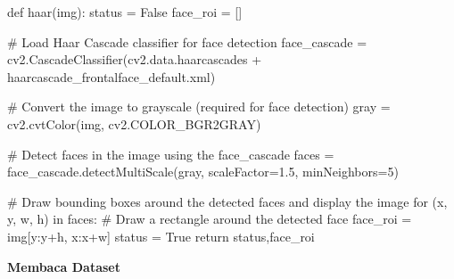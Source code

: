 \documentclass[
  letterpaper,
  DIV=11,
  numbers=noendperiod]{scrreprt}
\newenvironment{Shaded}{\begin{snugshade}}{\end{snugshade}}
\newcommand{\CommentTok}[1]{\textcolor[rgb]{0.37,0.37,0.37}{#1}}
\newcommand{\ControlFlowTok}[1]{\textcolor[rgb]{0.00,0.23,0.31}{#1}}
\newcommand{\DecValTok}[1]{\textcolor[rgb]{0.68,0.00,0.00}{#1}}
\newcommand{\FloatTok}[1]{\textcolor[rgb]{0.68,0.00,0.00}{#1}}
\newcommand{\KeywordTok}[1]{\textcolor[rgb]{0.00,0.23,0.31}{#1}}
\newcommand{\NormalTok}[1]{\textcolor[rgb]{0.00,0.23,0.31}{#1}}
\newcommand{\OperatorTok}[1]{\textcolor[rgb]{0.37,0.37,0.37}{#1}}
\newcommand{\StringTok}[1]{\textcolor[rgb]{0.13,0.47,0.30}{#1}}
\newcommand{\VariableTok}[1]{\textcolor[rgb]{0.07,0.07,0.07}{#1}}
\begin{document}
\begin{Shaded}
\begin{Highlighting}[]
\KeywordTok{def}\NormalTok{ haar(img):}
\NormalTok{    status }\OperatorTok{=} \VariableTok{False}
\NormalTok{    face\_roi }\OperatorTok{=}\NormalTok{ [] }

    \CommentTok{\# Load Haar Cascade classifier for face detection}
\NormalTok{    face\_cascade }\OperatorTok{=}\NormalTok{ cv2.CascadeClassifier(cv2.data.haarcascades }\OperatorTok{+} \StringTok{\textquotesingle{}haarcascade\_frontalface\_default.xml\textquotesingle{}}\NormalTok{) }

    \CommentTok{\# Convert the image to grayscale (required for face detection)}
\NormalTok{    gray }\OperatorTok{=}\NormalTok{ cv2.cvtColor(img, cv2.COLOR\_BGR2GRAY)}

    \CommentTok{\# Detect faces in the image using the face\_cascade}
\NormalTok{    faces }\OperatorTok{=}\NormalTok{ face\_cascade.detectMultiScale(gray, scaleFactor}\OperatorTok{=}\FloatTok{1.5}\NormalTok{, minNeighbors}\OperatorTok{=}\DecValTok{5}\NormalTok{) }

    \CommentTok{\# Draw bounding boxes around the detected faces and display the image}
    \ControlFlowTok{for}\NormalTok{ (x, y, w, h) }\KeywordTok{in}\NormalTok{ faces:}
        \CommentTok{\# Draw a rectangle around the detected face}
\NormalTok{        face\_roi }\OperatorTok{=}\NormalTok{ img[y:y}\OperatorTok{+}\NormalTok{h, x:x}\OperatorTok{+}\NormalTok{w]}
\NormalTok{        status }\OperatorTok{=} \VariableTok{True}
    \ControlFlowTok{return}\NormalTok{ status,face\_roi}
\end{Highlighting}
\end{Shaded}

\textbf{Membaca Dataset}
\end{document}
